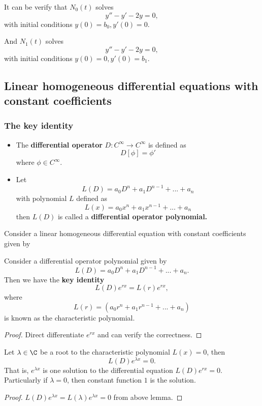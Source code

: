 \begin{refsection}
\begin{example}
It can be verify that $N_0(t)$ solves
$$y'' - y' - 2y =0,$$
with initial conditions $y(0) = b_0, y'(0) = 0.$

And $N_1(t)$ solves
$$y'' - y' - 2y =0,$$
with initial conditions $y(0) = 0, y'(0) = b_1.$
\end{example}



\subsection{Linear homogeneous differential equations with constant coefficients}
\subsubsection{The key identity}
\begin{definition}\hfill
\begin{itemize}
	\item The \textbf{differential operator} $D:C^\infty \to C^{\infty}$ is defined as
	$$D[\phi] = \phi'$$
	where $\phi\in C^\infty$.
	\item Let $$L(D)=a_0D^n + a_1D^{n-1} + ... + a_n$$ with polynomial $L$ defined as
	$$L(x) = a_0x^n + a_1x^{n-1} + ... + a_n $$
	then $L(D)$ is called a \textbf{differential operator polynomial.}
\end{itemize}	
\end{definition}

\begin{definition}
Consider a linear homogeneous differential equation with constant coefficients given by
\end{definition}


\begin{theorem}\label{ch:dynamical-systems:th:keyIdentityLinearHomogeneousODE}
Consider a differential operator polynomial given by $$L(D)=a_0D^n + a_1D^{n-1} + ... + a_n.$$
Then we have the \textbf{key identity} $$L(D)e^{rx} = L(r)e^{rx},$$
where $$L(r) = (a_0r^n + a_1r^{n-1} + ... + a_n)$$
is known as the characteristic polynomial.
\end{theorem}
\begin{proof}
Direct differentiate $e^{rx}$ and can verify the correctness.
\end{proof}


\begin{theorem}\label{ch:dynamical-systems:th:characteristicSolutiontolinearhomogeneousODE}
Let $\lambda \in \C$ be a root to the characteristic polynomial $L(x) = 0$, then
$$L(D)e^{\lambda x} = 0.$$
That is, $e^{\lambda x}$ is one solution to the differential equation $L(D)e^{rx} = 0$. Particularly if $\lambda = 0$, then constant function $1$ is the solution.
\end{theorem}
\begin{proof}
 $L(D)e^{\lambda x} = L(\lambda)e^{\lambda x} = 0$ from above lemma.
\end{proof}


\end{refsection}
